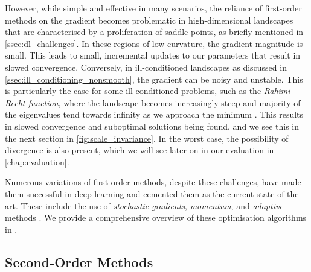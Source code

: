 However, while simple and effective in many scenarios, the reliance of first-order methods on the gradient becomes problematic in high-dimensional landscapes that are characterised by a proliferation of saddle points, as briefly mentioned in \cref{ssec:dl_challenges}. In these regions of low curvature, the gradient magnitude is small. This leads to small, incremental updates to our parameters that result in slowed convergence. Conversely, in ill-conditioned landscapes as discussed in \cref{ssec:ill_conditioning_nonsmooth}, the gradient can be noisy and unstable. 
This is particularly the case for some ill-conditioned problems, such as the \textit{Rahimi-Recht function}, where the landscape becomes increasingly steep and majority of the eigenvalues tend towards infinity as we approach the minimum \citep{recht2017kitchen}. This results in slowed convergence and suboptimal solutions being found, and we see this in the next section in \cref{fig:scale_invariance}. In the worst case, the possibility of divergence is also present, which we will see later on in our evaluation in \cref{chap:evaluation}. 

Numerous variations of first-order methods, despite these challenges, have made them successful in deep learning and cemented them as the current state-of-the-art. These include the use of \textit{stochastic gradients}, \textit{momentum}, and \textit{adaptive} methods \citep{robbins1951stochastic, kingma2014adam}. We provide a comprehensive overview of these optimisation algorithms in .

\subsection{Second-Order Methods}
\label{ssec:second_order_methods}

